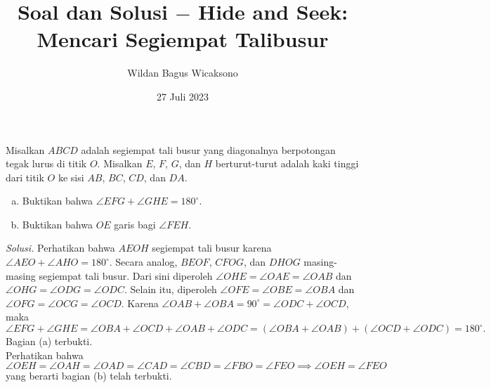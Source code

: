 \documentclass[12pt]{scrartcl}
\title{\textbf{Soal dan Solusi $-$ Hide and Seek: Mencari Segiempat Talibusur}}
\author{Wildan Bagus Wicaksono}
\date{27 Juli 2023}
\newcommand{\siku}[4][.21cm]
	{
	\coordinate (tempa) at ($(#3)!#1!(#2)$);
	\coordinate (tempb) at ($(#3)!#1!(#4)$);
	\coordinate (tempc) at ($(tempa)!0.5!(tempb)$);%
	\draw[black] (tempa) -- ($(#3)!2!(tempc)$) -- (tempb);
	}
\begin{document}
\maketitle

\renewcommand*\contentsname{Daftar Isi}
\tableofcontents

\newpage
\begin{tcolorbox}[title=\textbf{Soal 1: OSN 2016/1}]
Misalkan $ABCD$ adalah segiempat tali busur yang diagonalnya berpotongan tegak lurus di titik $O$. Misalkan $E$, $F$, $G$, dan $H$ berturut-turut adalah kaki tinggi dari titik $O$ ke sisi $AB$, $BC$, $CD$, dan $DA$.
\begin{enumerate}[(a).]
\item Buktikan bahwa $\angle EFG+\angle GHE=180^\circ$.
\item Buktikan bahwa $OE$ garis bagi $\angle FEH$.
\end{enumerate}
\end{tcolorbox}
\noindent\textit{Solusi.} Perhatikan bahwa $AEOH$ segiempat tali busur karena $\angle AEO+\angle AHO=180^\circ$. Secara analog, $BEOF$, $CFOG$, dan $DHOG$ masing-masing segiempat tali busur. Dari sini diperoleh $\angle OHE =\angle OAE=\angle OAB$ dan $\angle OHG=\angle ODG=\angle ODC$. Selain itu, diperoleh $\angle OFE =\angle OBE=\angle OBA$ dan $\angle OFG=\angle OCG =\angle OCD$. Karena $\angle OAB+\angle OBA =90^\circ=\angle ODC+\angle OCD$, maka
\[\angle EFG+\angle GHE =\angle OBA + \angle OCD +\angle OAB + \angle ODC = \left (\angle OBA +\angle OAB\right )+\left (\angle OCD+\angle ODC\right )=180^\circ. \]
Bagian (a) terbukti.\\
Perhatikan bahwa
\[\angle OEH = \angle OAH = \angle OAD = \angle CAD = \angle CBD = \angle FBO = \angle FEO\implies \angle OEH = \angle FEO\]
yang berarti bagian (b) telah terbukti.
\begin{center}
\end{center}
\end{document}
